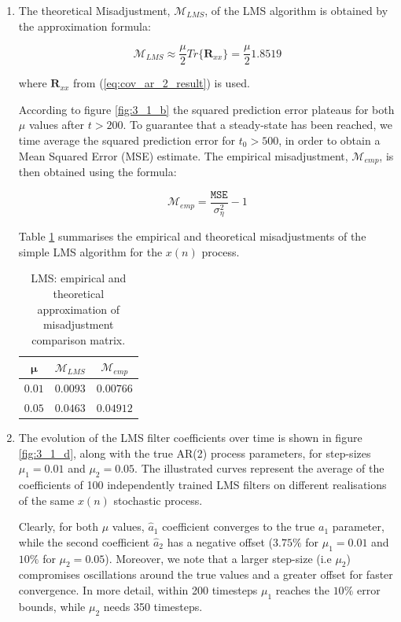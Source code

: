 \begin{enumerate}[label=\alph*), leftmargin=*]
\item
%

The theoretical Misadjustment, $\mathcal{M}_{LMS}$, of the LMS algorithm is obtained by the approximation formula:

\begin{equation}
    \mathcal{M}_{LMS} \approx \frac{\mu}{2} Tr\{ \mathbf{R}_{xx} \} = \frac{\mu}{2} 1.8519
\end{equation}

where $\mathbf{R}_{xx}$ from (\ref{eq:cov_ar_2_result}) is used.

According to figure \ref{fig:3_1_b} the squared prediction error plateaus for both $\mu$ values after $t > 200$. To guarantee that a steady-state has been reached,
we time average the squared prediction error for $t_{0} > 500$, in order to obtain a Mean Squared Error (MSE) estimate. The empirical misadjustment, $\mathcal{M}_{emp}$,
is then obtained using the formula:

\begin{equation}
    \mathcal{M}_{emp} = \frac{\mathtt{MSE}}{\sigma_{\eta}^{2}} - 1
\end{equation}

Table \ref{tab:3_1_c} summarises the empirical and theoretical misadjustments of the simple LMS algorithm for the $x(n)$ process.

\begin{table}[h]
\centering
\begin{tabular}{|c|c|c|}
\hline
$\boldsymbol{\mu}$ & $\mathcal{M}_{LMS}$ & $\mathcal{M}_{emp}$ \\
\hline
\hline
$0.01$ & $0.0093$ & $0.00766$ \\
\hline
$0.05$ & $0.0463$ & $0.04912$ \\
\hline
\end{tabular}
\caption{LMS: empirical and theoretical approximation of misadjustment comparison matrix.}
\label{tab:3_1_c}
\end{table}

\item
%

The evolution of the LMS filter coefficients over time is shown in figure \ref{fig:3_1_d}, along with the true AR(2) process parameters, for step-sizes $\mu_{1} = 0.01$ and $\mu_{2} = 0.05$.
The illustrated curves represent the average of the coefficients of 100 independently trained LMS filters on different realisations of the same $x(n)$ stochastic process.

Clearly, for both $\mu$ values, $\hat{a}_{1}$ coefficient converges to the true $a_{1}$ parameter, while the second coefficient $\hat{a}_{2}$ has a negative offset
($3.75\%$ for $\mu_{1} = 0.01$ and $10\%$ for $\mu_{2} = 0.05$). Moreover, we note that a larger step-size (i.e $\mu_{2}$) compromises oscillations around the true values and a greater offset
for faster convergence. In more detail, within 200 timesteps $\mu_{1}$ reaches the $10\%$ error bounds, while $\mu_{2}$ needs 350 timesteps.


\end{enumerate}
